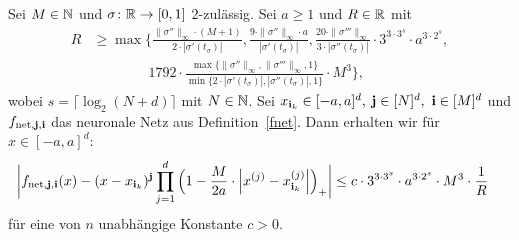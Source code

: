 \begin{lem}
\label{lem:5}
Sei $M \in \mathbb{N}$ und $\sigma\colon \mathbb{R} \to [0, 1]$ $2$-zulässig.
Sei $a \geq 1$ und $R \in \mathbb{R}$ mit
\begin{equation*}
\begin{split}
R & \geq \max\biggl\{\frac{\|\sigma''\|_{\infty} \cdot (M + 1)}{2 \cdot |\sigma'(t_{\sigma})|}, \frac{9 \cdot \|\sigma''\|_{\infty} \cdot a}{|\sigma'(t_{\sigma})|}, \frac{20 \cdot \|\sigma'''\|_{\infty}}{3 \cdot |\sigma''(t_{\sigma})|} \cdot 3^{3 \cdot 3^s} \cdot a^{3 \cdot 2^s}, \\[0.5em]
& \qquad \qquad 1792 \cdot \frac{\max\{\|\sigma''\|_{\infty},\|\sigma'''\|_{\infty}, 1\}}{\min\{2 \cdot |\sigma'(t_{\sigma})|, |\sigma''(t_{\sigma})|, 1\}} \cdot M^3 \biggr\},
\end{split}
\end{equation*}
wobei $s = \lceil\log_2(N + d)\rceil$ mit $N \in \mathbb{N}$. Sei $x_{{\mathbf{i}}_k} \in [-a, a]^d,$ $\mathbf{j} \in [N]^d,$ $\mathbf{i} \in [M]^d$ und $f_{\mathrm{net},\mathbf{j},\mathbf{i}}$ das neuronale Netz aus Definition~\ref{fnet}.
Dann erhalten wir für $x \in [-a, a]^d$:
\begin{equation*}
\begin{split}
& \bigg|f_{\mathrm{net},\mathbf{j},\mathbf{i}}(x) - (x - x_{\mathbf{i}_k})^{\mathbf{j}} \prod_{j = 1}^d \Big(1 - \frac{M}{2a} \cdot \Big|x^{(j)} - x_{\mathbf{i}_k}^{(j)}\Big|\Big)_+\bigg| \leq c \cdot 3^{3 \cdot 3^s} \cdot a^{3 \cdot 2^s} \cdot M^3 \cdot \frac{1}{R}
\end{split}
\end{equation*}
für eine von $n$ unabhängige Konstante $c > 0$.
\end{lem} 
 
